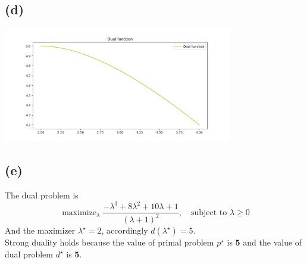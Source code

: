 \documentclass[12pt, a4 paper]{article}
\begin{document}
\begin{framed}
        \subsection{(d)}
        {\centering
        \includegraphics[width=10cm, height=5cm]{7d.jpg}
        }

        \subsection{(e)}
        The dual problem is
        $$
        \mathop{\text{maximize}}_{\lambda} \frac{-\lambda^{3} +
        8\lambda^{2} + 10\lambda + 1}{(\lambda+1)^{2}}, \quad
        \text{subject to } \lambda \geq 0
        $$
        \indent And the maximizer $\lambda^{\star} = 2$, accordingly
        $d(\lambda^{\star}) = 5$.\\
        \indent Strong duality holds because the value of primal problem
        $p^{\star}$ is \textbf{5} and the value of dual problem $d^{\star}$
        is \textbf{5}.
    \end{framed}
\end{document}
